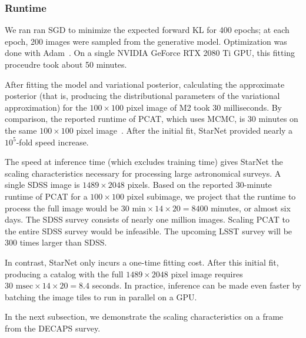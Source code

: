 \subsubsection{Runtime}
\label{sec:runtime}
We ran ran SGD to minimize the expected forward KL
for 400 epochs; at each epoch, 200 images were sampled from the generative model.
Optimization was done with Adam~\citep{kingma2014adam}.
On a single NVIDIA GeForce RTX 2080 Ti GPU,
this fitting proceudre took about 50 minutes.

After fitting the model and variational posterior,
calculating the approximate posterior
(that is, producing the distributional parameters of the variational approximation) for the $100 \times 100$ pixel image of M2 took $30$ milliseconds.
By comparison, the reported runtime of PCAT, which uses MCMC, is 30 minutes on the same $100 \times 100$ pixel image~\citep{Feder_2019}.
After the initial fit, StarNet provided nearly a $10^5$-fold speed increase.

The speed at inference time (which excludes training time) gives StarNet the scaling characteristics necessary for processing large astronomical surveys.
A single SDSS image is $1489 \times 2048$ pixels.
Based on the reported 30-minute runtime of PCAT for a $100\times100$ pixel subimage, we project that
the runtime to process the full image would be $30\text{ min} \times 14 \times 20 = 8400$ minutes, or almost six days.
The SDSS survey consists of nearly one million images. Scaling PCAT to the entire SDSS survey would be infeasible.
The upcoming LSST survey will be 300 times larger than SDSS.

In contrast, StarNet only incurs a one-time fitting cost.
After this initial fit,
producing a catalog with the full $1489 \times 2048$ pixel image requires
$30\text{ msec} \times 14 \times 20 = 8.4$ seconds. In practice,
inference can be made even faster by batching the image tiles to run in parallel on a GPU.

In the next subsection, we demonstrate the scaling characteristics on a frame from
the DECAPS survey. 


